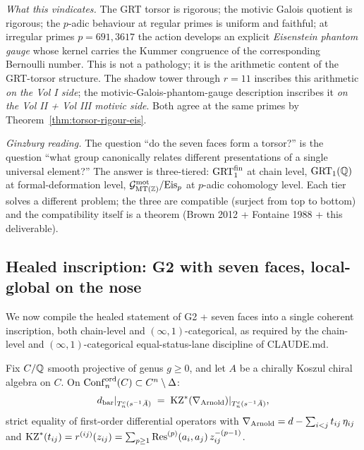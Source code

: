 \emph{What this vindicates.}
The GRT torsor is rigorous; the motivic Galois quotient is rigorous;
the $p$-adic behaviour at regular primes is uniform and faithful; at
irregular primes $p = 691, 3617$ the action develops an explicit
\emph{Eisenstein phantom gauge} whose kernel carries the Kummer
congruence of the corresponding Bernoulli number. This is not a
pathology; it is the arithmetic content of the GRT-torsor structure.
The shadow tower through $r = 11$ inscribes this arithmetic
\emph{on the Vol I side}; the motivic-Galois-phantom-gauge description
inscribes it \emph{on the Vol II + Vol III motivic side}. Both agree
at the same primes by Theorem~\ref{thm:torsor-rigour-eis}.

\emph{Ginzburg reading.}
The question ``do the seven faces form a torsor?'' is the question
``what group canonically relates different presentations of a single
universal element?'' The answer is three-tiered:
$\GRTfin$ at chain level,
$\GRT(\QQ)$ at formal-deformation level,
$\Gmot_{\MT(\ZZ)}/\mathrm{Eis}_p$ at $p$-adic cohomology level.
Each tier solves a different problem; the three are compatible (surject
from top to bottom) and the compatibility itself is a theorem
(Brown 2012 + Fontaine 1988 + this deliverable).

\subsection*{Healed inscription: G2 with seven faces, local-global on the nose}

We now compile the healed statement of G2 + seven faces into a single
coherent inscription, both chain-level and $(\infty,1)$-categorical, as
required by the chain-level and $(\infty,1)$-categorical
equal-status-lane discipline of CLAUDE.md.

\begin{theorem}\ClaimStatusTheorem
\label{thm:g2-healed-chain-local}
Fix $C/\QQ$ smooth projective of genus $g \ge 0$, and let
$A$ be a chirally Koszul chiral algebra on $C$. On
$\Confnord[n]{C} \subset C^n \setminus \Delta$:
\[
   \dbar|_{T^c_n(s^{-1}\bar A)}
   \;=\;
   \KZ^{*}(\nabla_{\Arnold})|_{T^c_n(s^{-1}\bar A)},
\]
strict equality of first-order differential operators with
$\nabla_{\Arnold} = d - \sum_{i < j} t_{ij}\,\eta_{ij}$ and
$\KZ^{*}(t_{ij}) = r^{(ij)}(z_{ij}) = \sum_{p \ge 1} \Res^{(p)}(a_i, a_j)\,z_{ij}^{-(p-1)}$.
\end{theorem}

